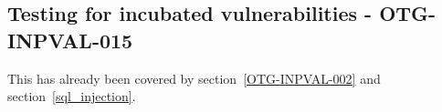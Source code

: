 \subsection{Testing for incubated vulnerabilities - OTG-INPVAL-015}
This has already been covered by section~\ref{OTG-INPVAL-002} and section~\ref{sql_injection}.
\clearpage